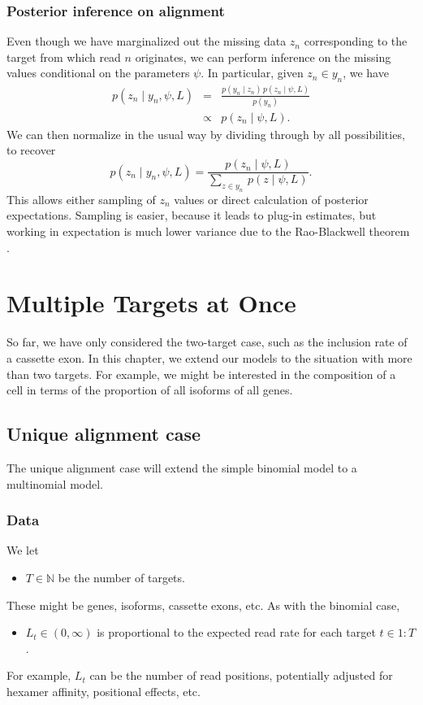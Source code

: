 \documentclass[11pt]{report}
\newcommand{\rngto}[1]{1{:}#1}
\begin{document}
\subsection{Posterior inference on alignment}

Even though we have marginalized out the missing data $z_n$
corresponding to the target from which read $n$ originates, we
can perform inference on the missing values conditional on the
parameters $\psi$.  In particular, given $z_n \in y_n$, we have
%
\begin{eqnarray*}
  p(z_n \mid y_n, \psi, L) & = & \frac{p(y_n \mid z_n) \, p(z_n \mid \psi, L)}{p(y_n)}
  \\
  & \propto & p(z_n \mid \psi, L).
\end{eqnarray*}
%
We can then normalize in the usual way by dividing through by all
possibilities, to recover
\[
  p(z_n \mid y_n, \psi, L)
  = \frac{p(z_n \mid \psi, L)}
         {\sum_{z \in y_n} \, p(z \mid \psi, L)}.
\]
This allows either sampling of $z_n$ values or direct calculation of
posterior expectations.  Sampling is easier, because it leads to
plug-in estimates, but working in expectation is much lower variance
due to the Rao-Blackwell theorem \citep[Section~4.2]{robert2004monte}.



\chapter{Multiple Targets at Once}

So far, we have only considered the two-target case, such as the
inclusion rate of a cassette exon.  In this chapter, we extend our
models to the situation with more than two targets.  For example, we
might be interested in the composition of a cell in terms of the
proportion of all isoforms of all genes.

\section{Unique alignment case}

The unique alignment case will extend the simple binomial model to a
multinomial model.

\subsection{Data}

We let
%
\begin{itemize}
\item $T \in \mathbb{N}$ be the number of targets.
\end{itemize}
%
These might be genes, isoforms, cassette exons, etc.  As with the
binomial case,
%
\begin{itemize}
\item $L_t \in (0, \infty)$ is proportional to the expected read rate
  for each target $t \in \rngto{T}$.
\end{itemize}
%
For example, $L_t$ can be the number of read positions, potentially
adjusted for hexamer affinity, positional effects, etc.
\end{document}
